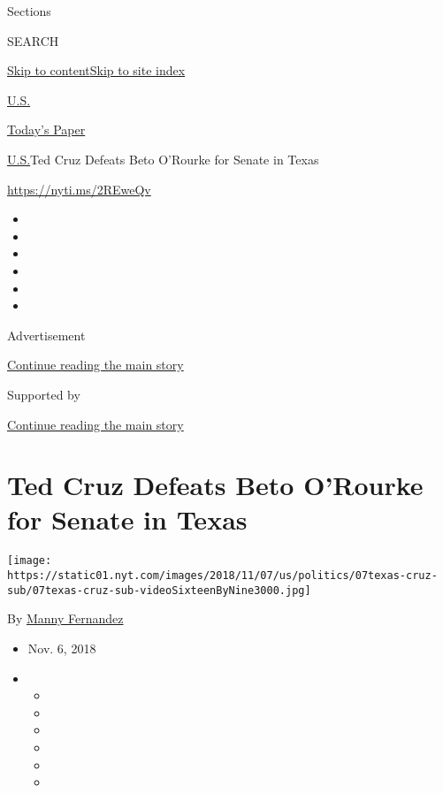 Sections

SEARCH

\protect\hyperlink{site-content}{Skip to
content}\protect\hyperlink{site-index}{Skip to site index}

\href{https://www.nytimes.com/section/us}{U.S.}

\href{https://myaccount.nytimes.com/auth/login?response_type=cookie\&client_id=vi}{}

\href{https://www.nytimes.com/section/todayspaper}{Today's Paper}

\href{/section/us}{U.S.}\textbar{}Ted Cruz Defeats Beto O'Rourke for
Senate in Texas

\url{https://nyti.ms/2REweQv}

\begin{itemize}
\item
\item
\item
\item
\item
\item
\end{itemize}

Advertisement

\protect\hyperlink{after-top}{Continue reading the main story}

Supported by

\protect\hyperlink{after-sponsor}{Continue reading the main story}

\hypertarget{ted-cruz-defeats-beto-orourke-for-senate-in-texas}{%
\section{Ted Cruz Defeats Beto O'Rourke for Senate in
Texas}\label{ted-cruz-defeats-beto-orourke-for-senate-in-texas}}

\texttt{[image: https://static01.nyt.com/images/2018/11/07/us/politics/07texas-cruz-sub/07texas-cruz-sub-videoSixteenByNine3000.jpg]}

By \href{https://www.nytimes.com/by/manny-fernandez}{Manny Fernandez}

\begin{itemize}
\item
  Nov. 6, 2018
\item
  \begin{itemize}
  \item
  \item
  \item
  \item
  \item
  \item
  \end{itemize}
\end{itemize}

